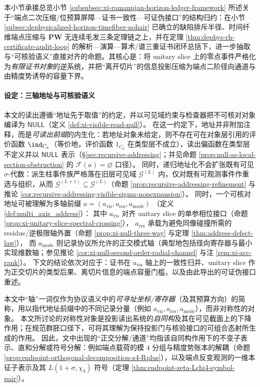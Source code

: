 本小节承接总览小节 \ref{subsubsec:xi-ramanujan-horizon-ledger-framework} 所述关于“端点二次压缩/位预算屏障—证书一致性—可证伪接口”的结构归约：在小节 \ref{subsec:dephysicalized-horizon-timefiber-nohair} 已确立的缺陷排斥半径、时间纤维端点压缩与 \(\mathbf{PW}\) 无连续毛发三条定理链之上，并在定理 \ref{thm:dephys-rh-certificate-audit-loop} 的解析—演算—算术/谱三重证书闭环总括下，进一步抽取与“可核验语义”直接对齐的命题。其核心是：将 unitary slice 上的零点事件严格化为\emph{有限证书对象}的逆系统，并把“离开切片”的信息投影压缩为端点二阶径向通道与由精度势诱导的容量下界。

\paragraph{设定：三轴地址与可核验语义}
本文的读出遵循“地址先于取值”的约定，并以可见域约束与检查器把不可核对对象编译为 \(\mathsf{NULL}\)（定义 \ref{def:xi-visible-read-null}）。
在这一约定下，地址并非附加注释，而是\emph{可读出前缀}的内生化：若地址对象未给定，则不存在可在对象层引用的评价函数 \(\ind_{C_a}\)（等价地，评价函数 \(1_{C_a}\) 在类型层不成立），读出偏函数在类型层不定义并以 \(\mathsf{NULL}\) 表示（\S\ref{sec:recursive-addressing}；并见命题 \ref{prop:null-as-local-section-obstruction} 的 \(\mathscr{F}(a)=\varnothing\) 口径）。
同时，递归地址化不会扩张既有可见 \(\sigma\)-代数：派生柱事件族严格落在旧层可见域 \(\mathcal{G}^{(L)}\) 内，仅对既有可观测事件作重选与组织，从而 \(\mathcal{G}^{(L+1)}\subseteq \mathcal{G}^{(L)}\)（命题 \ref{prop:recursive-addressing-refinement} 与推论 \ref{cor:recursive-addressing-visible-sigma-nonexpansion}）。
同时，一个可核对地址可被理解为多轴前缀
\(
a=(a_{\mathrm{vis}},a_{\mathrm{res}},a_{\mathrm{mode}})
\)
（定义 \ref{def:multi_axis_address}）：
其中 \(a_{\mathrm{vis}}\) 对齐 unitary slice 的单参相位接口（命题 \ref{prop:xi-unitary-slice-spectral-crossing}），
\(a_{\mathrm{res}}\) 承载为避免同像碰撞所需的 residue/逆极限轴外置（命题 \ref{prop:xi-null-three-way} 与定理 \ref{thm:address-defect-law}），
而 \(a_{\mathrm{mode}}\) 则记录协议所允许的正交模式轴（典型地包括径向寄存器与最小实现维数轴；参见推论 \ref{cor:xi-null-second-order-radial-channel} 与注 \ref{rem:xi-acc-rank}）。
下文的结论依次对应于：证书在 \(a_{\mathrm{vis}}\) 轴上的一致性归并、unitary slice 作为正交切片的类型后果、离切片信息的端点容量门槛，以及由此导出的可证伪接口重述。

\begin{remark}\label{rem:axis-vs-automorphism-terminology}
本文中“轴”一词仅作为协议语义中的\emph{可寻址坐标/寄存器}（及其预算方向）的简称，用以指代地址前缀中的不同记录分量（例如 \(a_{\mathrm{vis}},a_{\mathrm{res}},a_{\mathrm{mode}}\)），而非对称性的对象。
本文所讨论的对称性对象是投影读出系统的\emph{自同构}及其在可见截面上的下降作用；在规范群胚口径下，可将其理解为保持投影门与核验接口的可组合态射所生成的作用。
因此，文中出现的“正交分解/通道”均指该自同构作用下的不变子表示、直和分解或符号分解：例如端点载荷的模 \(4\) 分组与精度势账本的解耦（命题 \ref{prop:endpoint-orthogonal-decomposition-z4-Rplus}），以及端点反变观测的一维本征子表示及其 \(L(1+\sigma,\chi_4)\) 符号（定理 \ref{thm:endpoint-zeta-Lchi4-symbol-pair}）。
\end{remark}

